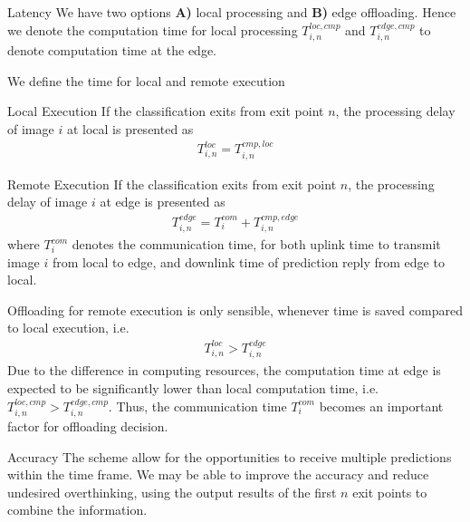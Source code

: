 	\begin{enumdescript}
		\item[Latency]  We have two options \textbf{A)} local processing and \textbf{B)} edge offloading. Hence we denote the computation time for local processing $ T_{i,n}^{loc,cmp} $ and $ T_{i,n}^{edge,cmp} $ to denote computation time at the edge. 
	
		We define the time for local and remote execution

		\begin{enumdescript}
			\item[Local Execution] If the classification exits from exit point $ n $, the processing delay of image $ i $ at local is presented as
			\begin{align}
			T_{i,n}^{loc}= T_{i,n}^{cmp,loc}
			\end{align}
			\item[Remote Execution] If the classification exits from exit point $ n $, the processing delay of image $ i $ at edge is presented as
			\begin{align}
			T_{i,n}^{edge}=T_{i}^{com}+ T_{i,n}^{cmp,edge}
			\end{align}
			where $ T^{com}_i $ denotes the communication time, for both uplink time to transmit image $ i $ from local to edge, and downlink time of prediction reply from edge to local.
			
			Offloading for remote execution is only sensible, whenever time is saved compared to local execution, i.e.
			\begin{align*}
					T_{i,n}^{loc} > T_{i,n}^{edge}
			\end{align*}
			Due to the difference in computing resources, the computation time at edge is expected to be significantly lower than local computation time, i.e. $ T_{i,n}^{loc,cmp} > T_{i,n}^{edge,cmp} $. Thus, the communication time $ T^{com}_i $ becomes an important factor for offloading decision.

		\end{enumdescript}
	
		\item[Accuracy] The scheme allow for the opportunities to receive multiple predictions within the time frame. We may be able to improve the accuracy and reduce undesired overthinking, using the output results of the first $ n $ exit points to combine the information.
		

\end{enumdescript}
